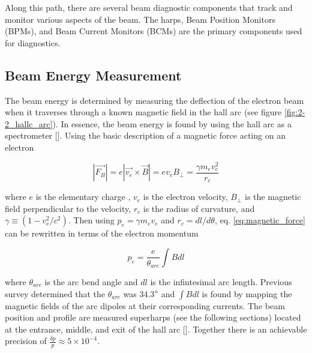 \documentclass[
]{report}
\begin{document}


Along this path, there are several beam diagnostic components that track
and monitor various aspects of the beam. The harps, Beam Position
Monitors (BPMs), and Beam Current Monitors (BCMs) are the primary
components used for diagnostics.



\hypertarget{beam-energy-measurement}{%
\subsection{Beam Energy Measurement}\label{beam-energy-measurement}}

The beam energy is determined by measuring the deflection of the
electron beam when it traverses through a known magnetic field in the
hall arc (see figure \ref{fig:2-2_hallc_arc}). In essence, the beam
energy is found by using the hall arc as a spectrometer
{[}\cite{yan_beam_1993}{]}. Using the basic description of a magnetic
force acting on an electron

\begin{equation} 
  |\vec{F_{B}}|=e|\vec{v_e}\times\vec{B}|=ev_{e}B_{\perp}=\frac{\gamma m_{e}v^2_e}{r_c}
  \label{eq:magnetic_force} 
\end{equation}

where \(e\) is the elementary charge , \(v_e\) is the electron velocity,
\(B_{\perp}\) is the magnetic field perpendicular to the velocity,
\(r_c\) is the radius of curvature, and \(\gamma\equiv(1-v^2_e/c^2)\).
Then using \(p_e=\gamma m_e v_e\) and \(r_c=dl/d\theta\), eq.
\ref{eq:magnetic_force} can be rewritten in terms of the electron
momentum

\begin{equation} 
  p_e=\frac{e}{\theta_{arc}}\int B dl
  \label{eq:electron_momentum} 
\end{equation}

where \(\theta_{arc}\) is the arc bend angle and \(dl\) is the
infintesimal arc length. Previous survey determined that the
\(\theta_{arc}\) was 34.3\(\degree\) and \(\int B dl\) is found by
mapping the magnetic fields of the arc dipoles at their corresponding
currents. The beam position and profile are measured superharps (see the
following sections) located at the entrance, middle, and exit of the
hall arc {[}\cite{yan_superharp_1995}{]}. Together there is an
achievable precision of \(\frac{\delta p}{p}\approx 5\times 10^{-4}\).
\end{document}
